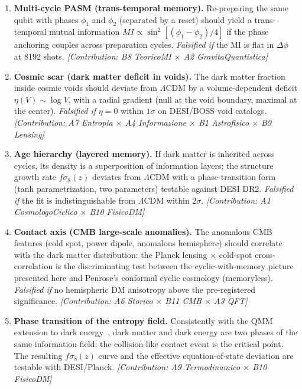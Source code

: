 \documentclass[12pt,a4paper]{article}
\begin{document}
\begin{enumerate}
    \item \textbf{Multi-cycle PASM (trans-temporal memory).} Re-preparing the same qubit with phases $\phi_1$ and $\phi_2$ (separated by a reset) should yield a trans-temporal mutual information $MI \propto \sin^2[(\phi_1-\phi_2)/4]$ if the phase anchoring couples across preparation cycles. \textit{Falsified if} the MI is flat in $\Delta\phi$ at 8192 shots. \textit{[Contribution: B8 TeoricoMI $\times$ A2 GravitaQuantistica]}
    \item \textbf{Cosmic scar (dark matter deficit in voids).} The dark matter fraction inside cosmic voids should deviate from $\Lambda$CDM by a volume-dependent deficit $\eta(V) \sim \log V$, with a radial gradient (null at the void boundary, maximal at the center). \textit{Falsified if} $\eta = 0$ within $1\sigma$ on DESI/BOSS void catalogs. \textit{[Contribution: A7 Entropia $\times$ A4 Informazione $\times$ B1 Astrofisico $\times$ B9 Lensing]}
    \item \textbf{Age hierarchy (layered memory).} If dark matter is inherited across cycles, its density is a superposition of information layers; the structure growth rate $f\sigma_8(z)$ deviates from $\Lambda$CDM with a phase-transition form (tanh parametrization, two parameters) testable against DESI DR2. \textit{Falsified if} the fit is indistinguishable from $\Lambda$CDM within $2\sigma$. \textit{[Contribution: A1 CosmologoCiclico $\times$ B10 FisicoDM]}
    \item \textbf{Contact axis (CMB large-scale anomalies).} The anomalous CMB features (cold spot, power dipole, anomalous hemisphere) should correlate with the dark matter distribution: the Planck lensing $\times$ cold-spot cross-correlation is the discriminating test between the cyclic-with-memory picture presented here and Penrose's conformal cyclic cosmology (memoryless). \textit{Falsified if} no hemispheric DM anisotropy above the pre-registered significance. \textit{[Contribution: A6 Storico $\times$ B11 CMB $\times$ A3 QFT]}
    \item \textbf{Phase transition of the entropy field.} Consistently with the QMM extension to dark energy~\cite{neukart2025de}, dark matter and dark energy are two phases of the same information field; the collision-like contact event is the critical point. The resulting $f\sigma_8(z)$ curve and the effective equation-of-state deviation are testable with DESI/Planck. \textit{[Contribution: A9 Termodinamico $\times$ B10 FisicoDM]}
\end{enumerate}
\end{document}
